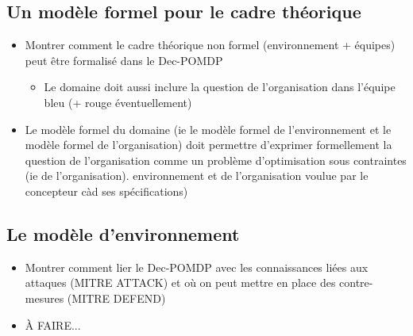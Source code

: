 \subsection{Un modèle formel pour le cadre théorique}
\begin{itemize}

    \item Montrer comment le cadre théorique non formel (environnement + équipes) peut être formalisé dans le Dec-POMDP
          \begin{itemize}
              \item Le domaine doit aussi inclure la question de l'organisation dans l'équipe bleu (+ rouge éventuellement)
          \end{itemize}
    \item Le modèle formel du domaine (ie le modèle formel de l'environnement et le modèle formel de l'organisation) doit permettre d'exprimer formellement la question de l'organisation comme un problème d'optimisation sous contraintes (ie de l'organisation). environnement et de l'organisation voulue par le concepteur càd ses spécifications)
\end{itemize}

\subsection{Le modèle d'environnement}
\begin{itemize}
    \item Montrer comment lier le Dec-POMDP avec les connaissances liées aux attaques (MITRE ATTACK) et où on peut mettre en place des contre-mesures (MITRE DEFEND)
    \item À FAIRE...
\end{itemize}


